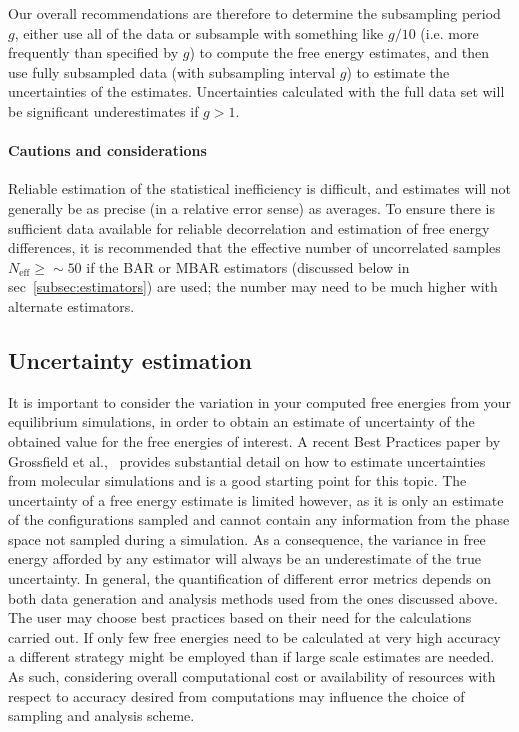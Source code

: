 \documentclass[9pt,bestpractices]{livecoms}
\begin{document}
Our overall recommendations are therefore to determine the subsampling period $g$, either use all of the data or subsample with something like $g/10$ (i.e. more frequently than specified by $g$) to compute the free energy estimates, and then use fully subsampled data (with subsampling interval $g$) to estimate the uncertainties of the estimates.  Uncertainties calculated with the full data set will be significant underestimates if $g > 1$.

\paragraph{Cautions and considerations}
Reliable estimation of the statistical inefficiency is difficult, and estimates will not generally be as precise (in a relative error sense) as averages.
To ensure there is sufficient data available for reliable decorrelation and estimation of free energy differences, it is recommended that the effective number of uncorrelated samples $N_{\mathrm{eff}} \ge  \sim 50$ if the BAR or MBAR estimators (discussed below in sec~\ref{subsec:estimators}) are used; the number may need to be much higher with alternate estimators.


\subsection{Uncertainty estimation}
\label{subsec:uncertainty}
It is important to consider the variation in your computed free energies from your equilibrium simulations, in order to obtain an estimate of uncertainty of the obtained value for the free energies of interest. A recent Best Practices paper by Grossfield et al.,~\cite{grossfield2018best} provides substantial detail on how to estimate uncertainties from molecular simulations and is a good starting point for this topic. 
The uncertainty of a free energy estimate is limited however, as it is only an estimate of the configurations sampled and cannot contain any information from the phase space not sampled during a simulation. As a consequence, the variance in free energy afforded by any estimator will always be an underestimate of the true uncertainty.
In general, the quantification of different error metrics depends on both data generation and analysis methods used from the ones discussed above. The user may choose best practices based on their need for the calculations carried out. If only few free energies need to be calculated at very high accuracy a different strategy might be employed than if large scale estimates are needed. As such, considering overall computational cost or availability of resources with respect to accuracy desired from computations may influence the choice of sampling and analysis scheme. 
\end{document}
